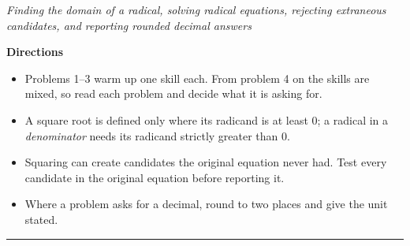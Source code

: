 \documentclass[12pt]{article}
\begin{document}

\begin{center}
\textit{Finding the domain of a radical, solving radical equations, rejecting extraneous candidates, and reporting rounded decimal answers}
\end{center}

\noindent\textbf{Directions}
\begin{itemize}[leftmargin=1.1cm, itemsep=1pt, topsep=3pt]
  \item Problems 1--3 warm up one skill each. From problem 4 on the skills are mixed, so read each problem and decide what it is asking for.
  \item A square root is defined only where its radicand is at least $0$; a radical in a \emph{denominator} needs its radicand strictly greater than $0$.
  \item Squaring can create candidates the original equation never had. Test every candidate in the original equation before reporting it.
  \item Where a problem asks for a decimal, round to two places and give the unit stated.
\end{itemize}

\vspace{0.2cm}
\noindent\rule{\linewidth}{0.4pt}





\end{document}
